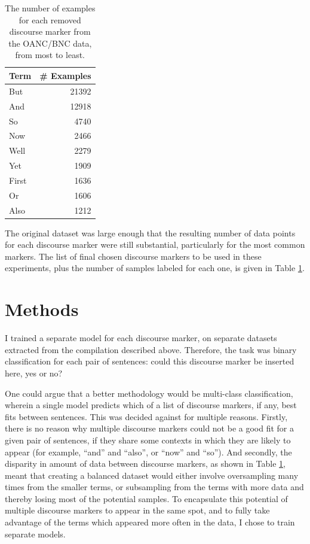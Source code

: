 \begin{table}[h]
\centering
 \begin{tabular}{|| l | r ||}
 \hline
 Term & \# Examples \\ [0.3ex] 
 \hline\hline
 But & 21392 \\
 \hline
 And & 12918 \\
 \hline
 So & 4740 \\
 \hline
 Now & 2466 \\
 \hline
 Well & 2279 \\
 \hline
 Yet & 1909 \\
 \hline
 First & 1636 \\
 \hline
 Or & 1606 \\
 \hline
 Also & 1212 \\
 \hline
\end{tabular}
\caption{The number of examples for each removed discourse marker from the OANC/BNC data, from most to least.}
\label{disc-mark-dm-stats}
\end{table}

The original dataset was large enough that the resulting number of data points for each discourse marker were still substantial, particularly for the most common markers. The list of final chosen discourse markers to be used in these experiments, plus the number of samples labeled for each one, is given in Table \ref{disc-mark-dm-stats}. 

\section{Methods}

I trained a separate model for each discourse marker, on separate datasets extracted from the compilation described above. Therefore, the task was binary classification for each pair of sentences: could this discourse marker be inserted here, yes or no?

One could argue that a better methodology would be multi-class classification, wherein a single model predicts which of a list of discourse markers, if any, best fits between sentences. This was decided against for multiple reasons. Firstly, there is no reason why multiple discourse markers could not be a good fit for a given pair of sentences, if they share some contexts in which they are likely to appear (for example, ``and'' and ``also'', or ``now'' and ``so''). And secondly, the disparity in amount of data between discourse markers, as shown in Table \ref{disc-mark-dm-stats}, meant that creating a balanced dataset would either involve oversampling many times from the smaller terms, or subsampling from the terms with more data and thereby losing most of the potential samples. To encapsulate this potential of multiple discourse markers to appear in the same spot, and to fully take advantage of the terms which appeared more often in the data, I chose to train separate models.

